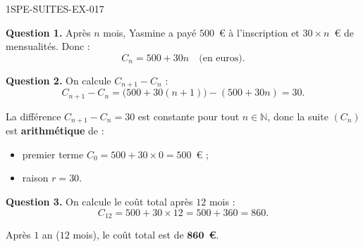 \begin{corrige}{1SPE-SUITES-EX-017}


\textbf{Question 1.} Après $n$ mois, Yasmine a payé $500$~€ à l'inscription et $30 \times n$~€ de mensualités. Donc :
\[
C_n = 500 + 30n \quad \text{(en euros).}
\]


\textbf{Question 2.} On calcule $C_{n+1} - C_n$ :
\[
C_{n+1} - C_n = \bigl(500 + 30(n+1)\bigr) - (500 + 30n) = 30.
\]

La différence $C_{n+1} - C_n = 30$ est constante pour tout $n \in \mathbb{N}$, donc la suite $(C_n)$ est \textbf{arithmétique} de :
\begin{itemize}
  \item premier terme $C_0 = 500 + 30 \times 0 = 500$~€ ;
  \item raison $r = 30$.
\end{itemize}


\textbf{Question 3.} On calcule le coût total après $12$ mois :
\[
C_{12} = 500 + 30 \times 12 = 500 + 360 = 860.
\]

Après $1$ an ($12$ mois), le coût total est de $\mathbf{860}$~\textbf{€}.

\end{corrige}
